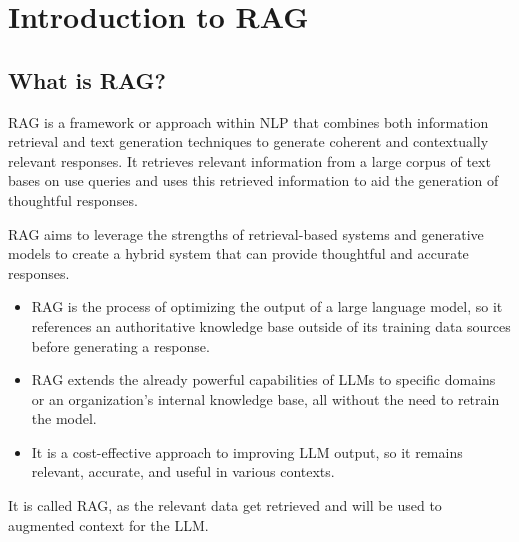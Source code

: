\documentclass[../main.tex]{subfiles}
\begin{document}
\chapter{Introduction to RAG}
\section{What is RAG?}
\gls{RAG} is a framework or approach within \gls{NLP} that combines both information retrieval and text generation techniques to generate coherent and contextually relevant responses. It retrieves relevant information from a large corpus of text bases on use queries and uses this retrieved information to aid the generation of thoughtful responses.

\gls{RAG} aims to leverage the strengths of retrieval-based systems and generative models to create a hybrid system that can provide thoughtful and accurate responses.
\begin{itemize}
	\item{\gls{RAG} is the process of optimizing the output of a large language model, so it references an authoritative knowledge base outside of its training data sources before generating a response.}
	\item{\gls{RAG} extends the already powerful capabilities of \gls{LLM}s to specific domains or an organization's internal knowledge base, all without the need to retrain the model.}
	\item{It is a cost-effective approach to improving \gls{LLM} output, so it remains relevant, accurate, and useful in various contexts.}
\end{itemize}
It is called \gls{RAG}, as the relevant data get retrieved and will be used to augmented context for the \gls{LLM}.
\end{document}

